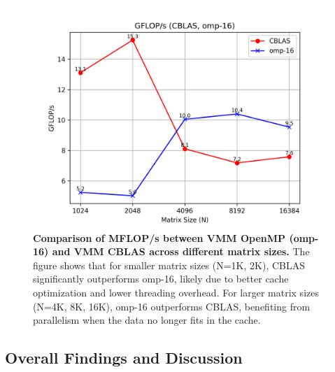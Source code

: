 \begin{figure}[htbp]
    \centering
    \includegraphics[width=1.0\linewidth]{images/GFLOPs-parallel.png}
    \caption{\textbf{Comparison of MFLOP/s between VMM OpenMP (omp-16) and VMM CBLAS across different matrix sizes.} The figure shows that for smaller matrix sizes (N=1K, 2K), CBLAS significantly outperforms omp-16, likely due to better cache optimization and lower threading overhead. For larger matrix sizes (N=4K, 8K, 16K), omp-16 outperforms CBLAS, benefiting from parallelism when the data no longer fits in the cache.}
    \label{fig:gflops-parallel}
\end{figure}

\subsection{Overall Findings and Discussion}
\label{subsec:overall-findings-and-discussion}

